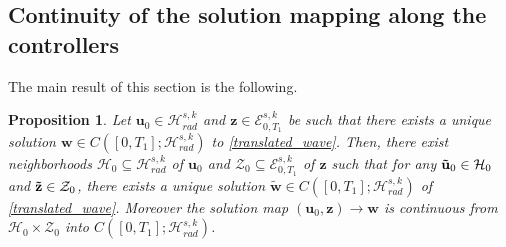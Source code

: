 \documentclass[12pt,reqno]{amsart}
\theoremstyle{plain}
\theoremstyle{remark}
\theoremstyle{plain}
\newtheorem{proposition}[theorem]{Proposition}
\theoremstyle{definition}
\numberwithin{equation}{section}
\numberwithin{equation}{section}
\newcommand{\HH}{\mathcal{H}}
\begin{document}
	\subsection{Continuity of the solution mapping along the controllers}\label{Data_Continuity}
	The main result of this section is the following.
	\begin{proposition}\label{continuity_no_blow_up}
		Let $\mathbf{u}_0\in \HH_{rad}^{s,k}$ and $ \mathbf{z}\in \mathcal{E}^{s,k}_{0,T_1}$ be such that there exists a unique solution $\mathbf{w}\in C([0,T_1];\HH_{rad}^{s,k} )$ to \eqref{translated_wave}. Then, there exist neighborhoods $\mathcal{H}_0 \subseteq \HH_{rad}^{s,k}$ of $\mathbf{u}_0$ and $\mathcal{Z}_0 \subseteq \mathcal{E}^{s,k}_{0,T_1}$ of $\mathbf{z}$ such that for any $\mathbf{\Tilde{u}}_0\in \mathcal{H}_0 $ and $\mathbf{\Tilde{z}}\in \mathcal{Z}_0$, there exists a unique solution $\mathbf{\tilde{w}} \in C([0,T_1]; \HH_{rad}^{s,k})$ of \eqref{translated_wave}. Moreover the solution map $(\mathbf{u}_0,\mathbf{z})\rightarrow \mathbf{w}$  is continuous from $\mathcal{H}_0\times \mathcal{Z}_0$ into $C([0,T_1];\HH_{rad}^{s,k})$.
	\end{proposition}
\end{document}
